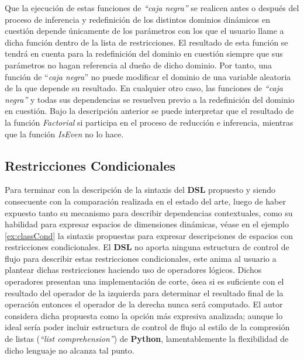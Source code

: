 Que la ejecución de estas funciones de {\it “caja negra”} se realicen antes o después del proceso de
inferencia y redefinición de los distintos dominios dinámicos en cuestión depende únicamente de los
parámetros con los que el usuario llame a dicha función dentro de la lista de restricciones. El resultado
de esta función se tendrá en cuenta para la redefinición del dominio en cuestión siempre que sus parámetros
no hagan referencia al dueño de dicho dominio. Por tanto, una función de ``{\it caja negra}'' no puede modificar
el dominio de una variable aleatoria de la que depende su resultado. En cualquier otro caso, las funciones de
    {\it “caja negra”} y todas sus dependencias se resuelven previo a la redefinición del dominio en cuestión. Bajo
la descripción anterior se puede interpretar que el resultado de la función {\it Factorial} si participa en el
proceso de reducción e inferencia, mientras que la función {\it IsEven} no lo hace.

\subsection{Restricciones Condicionales}

Para terminar con la descripción de la sintaxis del {\bf DSL} propuesto y siendo consecuente con la comparación realizada
en el estado del arte, luego de haber expuesto tanto su mecanismo para describir dependencias contextuales, como su
habilidad para expresar espacios de dimensiones dinámicas, véase en el ejemplo \ref{ex:classCond} la sintaxis propuestas para
expresar descripciones de espacios con restricciones condicionales. El {\bf DSL} no aporta ninguna estructura de control
de flujo para describir estas restricciones condicionales, este anima al usuario a plantear dichas restricciones
haciendo uso de operadores lógicos. Dichos operadores presentan una implementación de corte, ósea si es suficiente
con el resultado del operador de la izquierda para determinar el resultado final de la operación entonces el operador
de la derecha nunca será computado. El autor considera dicha propuesta como la opción más expresiva analizada; aunque
lo ideal sería poder incluir estructura de control de flujo al estilo de la compresión de listas  ({\it “list comprehension”})
de {\bf Python}, lamentablemente la flexibilidad de dicho lenguaje no alcanza tal punto.

